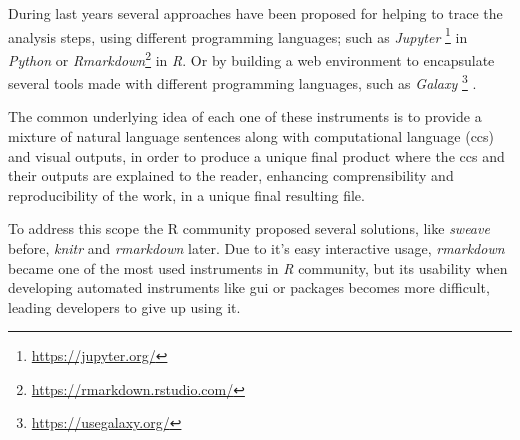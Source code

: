 During last years several approaches \cite{russo2015advantages} have been proposed for helping to trace the analysis steps, using different programming languages; such as  \textit{Jupyter} \footnote{\url{https://jupyter.org/}} \cite{Kluyver2016} in \textit{Python} or \textit{Rmarkdown}\footnote{\url{https://rmarkdown.rstudio.com/}} in \textit{R}.
Or by building a web environment to encapsulate several tools made with different programming languages, such as \textit{Galaxy} \footnote{\url{https://usegalaxy.org/}} \cite{Blankenberg2010, Giardine2005, Goecks2010}.

The common underlying idea of each one of these instruments is to provide a mixture of natural language sentences along with computational language (\glspl{cc}) and visual outputs, in order to produce a unique final product where the \glspl{cc} and their outputs are explained to the reader, enhancing comprensibility and reproducibility of the work, in a unique final resulting file.

To address this scope the R community proposed several solutions, like \textit{sweave} before, \textit{knitr} and \textit{rmarkdown} later.
Due to it's easy interactive usage, \textit{rmarkdown} became one of the most used instruments in \textit{R} community, but its usability when developing automated instruments like \gls{gui} or packages becomes more difficult, leading developers to give up using it.

